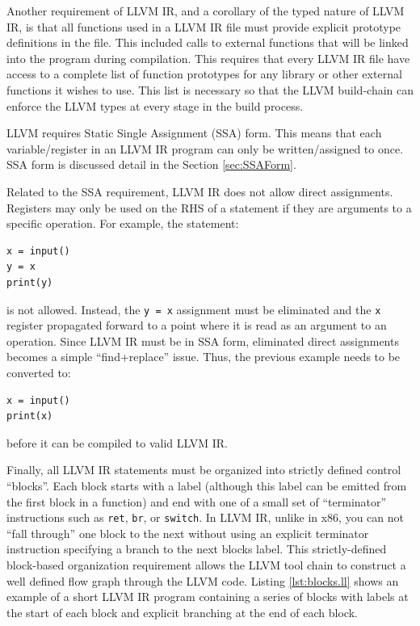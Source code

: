 \documentclass[11pt,twocolumn]{article}
\begin{document}
Another requirement of LLVM IR, and a corollary of the typed nature of
LLVM IR, is that all functions used in a LLVM IR file must provide
explicit prototype definitions in the file. This included calls to
external functions that will be linked into the program during
compilation. This requires that every LLVM IR file have access to a
complete list of function prototypes for any library or other external
functions it wishes to use. This list is necessary so that the LLVM
build-chain can enforce the LLVM types at every stage in the build
process.

LLVM requires Static Single Assignment (SSA) form. This means that
each variable/register in an LLVM IR program can only be
written/assigned to once. SSA form is discussed detail in the Section
\ref{sec:SSAForm}.

Related to the SSA requirement, LLVM IR does not allow direct
assignments. Registers may only be used on the RHS of a statement if
they are arguments to a specific operation. For example, the statement:
\begin{verbatim}
x = input()
y = x
print(y)
\end{verbatim} 
is not allowed. Instead, the \texttt{y = x} assignment must be
eliminated and the \texttt{x} register propagated forward to a point
where it is read as an argument to an operation. Since LLVM IR must be
in SSA form, eliminated direct assignments becomes a simple
``find+replace'' issue. Thus, the previous example needs to be
converted to:
\begin{verbatim}
x = input()
print(x)
\end{verbatim}
before it can be compiled to valid LLVM IR.

Finally, all LLVM IR statements must be organized into strictly
defined control ``blocks''. Each block starts with a label (although
this label can be emitted from the first block in a function) and end
with one of a small set of ``terminator'' instructions such as
\texttt{ret}, \texttt{br}, or \texttt{switch}. In LLVM IR, unlike in
x86, you can not ``fall through'' one block to the next without using
an explicit terminator instruction specifying a branch to the next
blocks label. This strictly-defined block-based organization
requirement allows the LLVM tool chain to construct a well defined
flow graph through the LLVM code. Listing \ref{lst:blocks.ll} shows an
example of a short LLVM IR program containing a series of blocks with
labels at the start of each block and explicit branching at the end of
each block.
\end{document}
